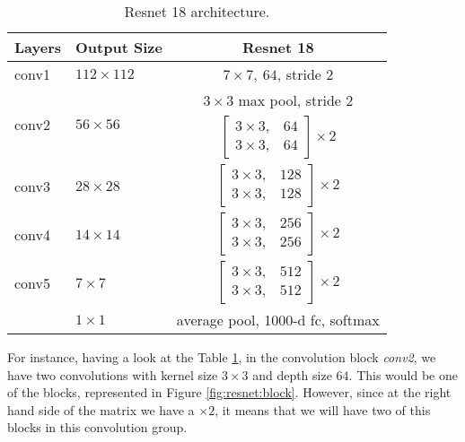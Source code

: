 \begin{table}[H]
    \label{arch:resnet:18}
    \centering
    \begin{tabular}{l|l|c}
    \hline
    Layers                      & Output Size                     & Resnet 18                                                                     \\ \hline
    conv1                    & $112\times112$                  & $7 \times 7, \ 64$, stride 2                                                  \\ \hline
    \multirow{2}{*}{conv2} & \multirow{2}{*}{$56 \times 56$} & $3 \times 3$ max pool, stride 2                                               \\ \cline{3-3} 
                                &                                 & $\begin{bmatrix}3 \times 3 , & 64 \\ 3 \times 3,& 64 \end{bmatrix} \times 2$  \\ \hline
    conv3                  & $28 \times 28$                  & $\begin{bmatrix} 3\times 3, & 128 \\ 3\times 3, & 128 \end{bmatrix} \times 2$ \\ \hline
    conv4                  & $14 \times 14$                  & $\begin{bmatrix} 3\times 3, & 256\\ 3\times 3, & 256\end{bmatrix} \times 2$   \\ \hline
    conv5                  & $7 \times 7$                    & $\begin{bmatrix} 3\times 3, & 512\\ 3\times 3, & 512\end{bmatrix} \times 2$   \\ \hline
                                & $1\times 1 $                    & average pool, 1000-d fc, softmax                                              \\ \hline
    \end{tabular}
    \caption{Resnet 18 architecture.}
    \end{table}

For instance, having a look at the Table \ref{arch:resnet:18}, in the convolution block \emph{conv2}, we have two convolutions with kernel size $3\times 3$ and depth size $64$. This would be one of the blocks, represented in Figure \ref{fig:resnet:block}. However, since at the right hand side of the matrix we have a $\times 2$, it means that we will have two of this blocks in this convolution group.